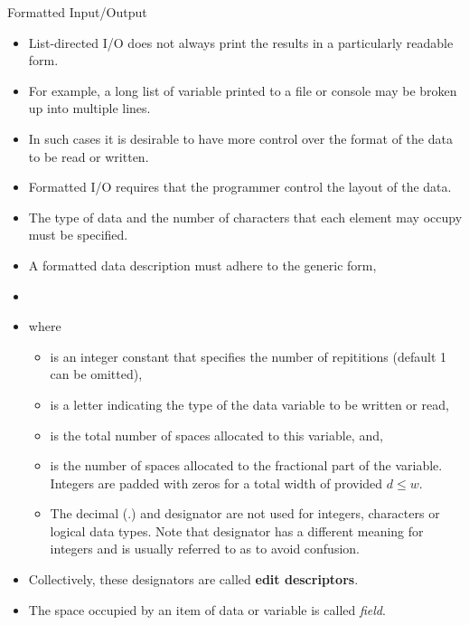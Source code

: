 \documentclass[10pt,t]{beamer}
\begin{document}
\begin{frame}{Formatted Input/Output}
  \begin{itemize}
    \item List-directed I/O does not always print the results in a particularly readable form.
    \item For example, a long list of variable printed to a file or console may be broken up into multiple lines.
    \item In such cases it is desirable to have more control over the format of the data to be read or written.
    \item Formatted I/O requires that the programmer control the layout of the data.
    \item The type of data and the number of characters that each element may occupy must be specified.
      \framebreak
    \item A formatted data description must adhere to the generic form,
    \item[] 
    \item[] where
      \begin{itemize}
        \item {} is an integer constant that specifies the number of repititions (default 1 can be omitted),
        \item {} is a letter indicating the type of the data variable to be written or read,
        \item {} is the total number of spaces allocated to this variable, and,
        \item {} is the number of spaces allocated to the fractional part of the variable. Integers are padded with zeros for a total width of  provided $d\le w$.
        \item The decimal (.) and  designator are not used for integers, characters or logical data types. Note that  designator has a different meaning for integers and is usually referred to as  to avoid confusion.
      \end{itemize}
    \item Collectively, these designators are called \textbf{edit descriptors}.
    \item The space occupied by an item of data or variable is called \textit{field}.
  \end{itemize}
  \begin{minipage}{\textwidth}
    \begin{center}

\end{center}
\end{minipage}
\end{frame}
\end{document}
